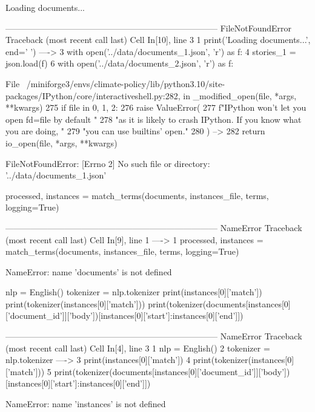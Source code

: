 \begin{pyprint}
Loading documents...
\end{pyprint}

\begin{pyprint}
---------------------------------------------------------------------------
FileNotFoundError                         Traceback (most recent call last)
Cell In[10], line 3
      1 print('Loading documents...', end=' ')
----> 3 with open('../data/documents_1.json', 'r') as f:
      4     stories_1 = json.load(f)
      6 with open('../data/documents_2.json', 'r') as f:

File ~/miniforge3/envs/climate-policy/lib/python3.10/site-packages/IPython/core/interactiveshell.py:282, in _modified_open(file, *args, **kwargs)
    275 if file in {0, 1, 2}:
    276     raise ValueError(
    277         f"IPython won't let you open fd={file} by default "
    278         "as it is likely to crash IPython. If you know what you are doing, "
    279         "you can use builtins' open."
    280     )
--> 282 return io_open(file, *args, **kwargs)

FileNotFoundError: [Errno 2] No such file or directory: '../data/documents_1.json'
\end{pyprint}

\begin{pyin}
processed, instances = match_terms(documents, instances_file, terms, logging=True)
\end{pyin}

\begin{pyprint}
---------------------------------------------------------------------------
NameError                                 Traceback (most recent call last)
Cell In[9], line 1
----> 1 processed, instances = match_terms(documents, instances_file, terms, logging=True)

NameError: name 'documents' is not defined
\end{pyprint}

\begin{pyin}
nlp = English()
tokenizer = nlp.tokenizer
print(instances[0]['match'])
print(tokenizer(instances[0]['match']))
print(tokenizer(documents[instances[0]['document_id']]['body'])[instances[0]['start']:instances[0]['end']])
\end{pyin}

\begin{pyprint}
---------------------------------------------------------------------------
NameError                                 Traceback (most recent call last)
Cell In[4], line 3
      1 nlp = English()
      2 tokenizer = nlp.tokenizer
----> 3 print(instances[0]['match'])
      4 print(tokenizer(instances[0]['match']))
      5 print(tokenizer(documents[instances[0]['document_id']]['body'])[instances[0]['start']:instances[0]['end']])

NameError: name 'instances' is not defined
\end{pyprint}

\begin{pyin}

\end{pyin}
